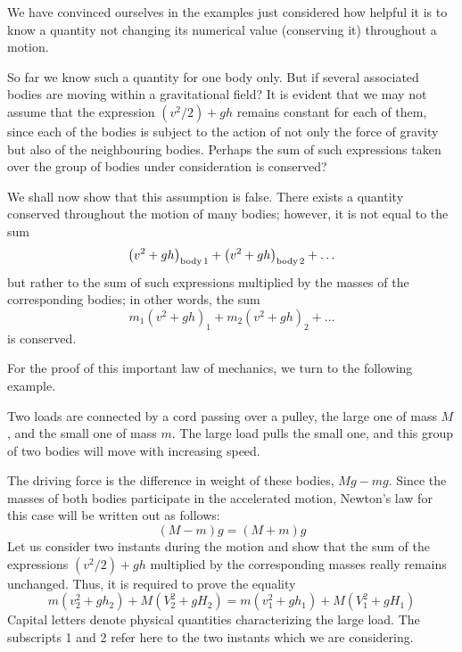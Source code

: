 We have convinced ourselves in the examples just considered how helpful it is to know a quantity not changing
its numerical value (conserving it) throughout a motion.

So far we know such a quantity for one body only. But
if several associated bodies are moving within a gravitational field? It is evident that we may not assume that
the expression $(v^{2}/2) + gh$ remains constant for each
of them, since each of the bodies is subject to the action
of not only the force of gravity but also of the neighbouring bodies. Perhaps the sum of such expressions taken over the group of bodies under consideration is conserved?

We shall now show that this assumption is false. There
exists a quantity conserved throughout the motion of
many bodies; however, it is not equal to the sum
\begin{equation*}%
\left( v^{2} + gh \right)_{\textrm{body\,1}}+
\left( v^{2} + gh \right)_{\textrm{body\,2}} + \ldots
\end{equation*}
but rather to the sum of such expressions multiplied by
the masses of the corresponding bodies; in other words,
the sum
\begin{equation*}%
m_{1}\left( v^{2} + gh \right)_{1}+
m_{2}\left( v^{2} + gh \right)_{2}+ \ldots
\end{equation*}
is conserved.

For the proof of this important law of mechanics, we
turn to the following example.

Two loads are connected by a cord passing over a pulley, the large one of mass $M$, and the small one of mass $m$. The large load pulls the small one, and this group of two bodies will move with increasing speed.

The driving force is the difference in weight of these bodies, $Mg - mg$. Since the masses of both bodies participate in the accelerated motion, Newton's law for this case will be written out as follows:
\begin{equation*}%
(M-m)g = (M+m)g
\end{equation*}
Let us consider two instants during the motion and
show that the sum of the expressions $(v^{2}/2) + gh$ multiplied by the corresponding masses really remains unchanged. Thus, it is required to prove the equality
\begin{equation*}%
m\left( v_{2}^{2} + gh_{2} \right)+
M\left( V_{2}^{2} + gH_{2} \right)
= m\left( v_{1}^{2} + gh_{1} \right)+
M\left( V_{1}^{2} + gH_{1} \right)
\end{equation*}
Capital letters denote physical quantities characterizing
the large load. The subscripts 1 and 2 refer here to the
two instants which we are considering.


